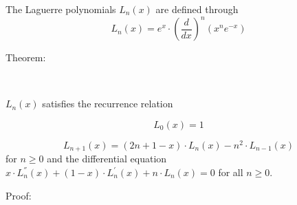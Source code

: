 \documentclass[12pt,a4paper,oneside,onecolumn]{article}
\begin{document}
The Laguerre polynomials  \( L_{n}(x) \) are defined through 
\[
L_{n}(x)=e^{x}\cdot \left( \frac{d}{dx}\right) ^{n}(x^{n}e^{-x})\]


\begin{description}

\item [Theorem:]~

\end{description}

 \( L_{n}(x) \) satisfies the recurrence relation


\[
L_{0}(x)=1\]



\[
L_{n+1}(x)=(2n+1-x)\cdot L_{n}(x)-n^{2}\cdot L_{n-1}(x)\]
for  \( n\geq 0 \) and the differential equation  \( x\cdot L_{n}^{''}(x)+(1-x)\cdot L_{n}^{'}(x)+n\cdot L_{n}(x)=0 \) for all  \( n\geq 0 \).

\begin{description}

\item [Proof:]~

\end{description}
\end{document}
